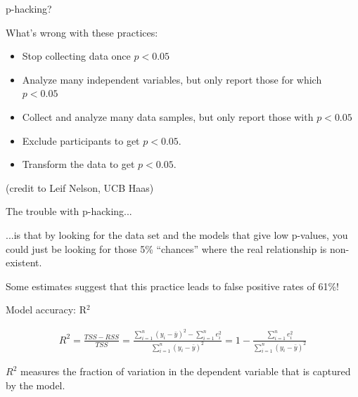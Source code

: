 \documentclass[aspectratio=169]{beamer}
\begin{document}
\begin{frame}{p-hacking?}

What's wrong with these practices:
\begin{itemize}
\item Stop collecting data once $p<0.05$
\item Analyze many independent variables, but only report those for which $p<0.05$
\item Collect and analyze many data samples, but only report those with $p<0.05$
\item Exclude participants to get  $p<0.05$.
\item Transform the data to get  $p<0.05$.
\end{itemize}

(credit to Leif Nelson, UCB Haas)

\end{frame}

\begin{frame}{The trouble with p-hacking...}

...is that by looking for the data set and the models that give low p-values, you could just be looking for those 5\% ``chances'' where the real relationship is non-existent.

\vspace{5mm}\pause

Some estimates suggest that this practice leads to false positive rates of 61\%!

\end{frame}

\begin{frame}{Model accuracy: R$^2$}

\begin{align*}
R^2 = \frac{TSS - RSS}{TSS} = \frac{\sum_{i=1}^n (y_i-\bar{y})^2 - \sum_{i=1}^n e_i^2}{\sum_{i=1}^n (y_i-\bar{y})^2} = 1-\frac{\sum_{i=1}^n e_i^2}{\sum_{i=1}^n (y_i-\bar{y})^2} 
\end{align*}

\pause
$R^2$ measures the fraction of variation in the dependent variable that is captured by the model.  

\end{frame}
\end{document}
